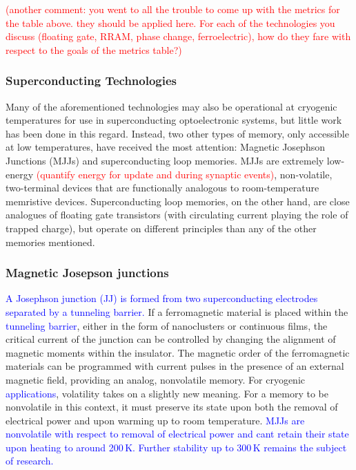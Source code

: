\documentclass[twocolumn]{article}
\begin{document}
\textcolor{red}{(another comment: you went to all the trouble to come up with the metrics for the table above. they should be applied here. For each of the technologies you discuss (floating gate, RRAM, phase change, ferroelectric), how do they fare with respect to the goals of the metrics table?)}

\subsubsection{Superconducting Technologies}
Many of the aforementioned technologies may also be operational at cryogenic temperatures for use in superconducting optoelectronic systems, but little work has been done in this regard. Instead, two other types of memory, only accessible at low temperatures, have received the most attention: Magnetic Josephson Junctions (MJJs) and superconducting loop memories. MJJs are extremely low-energy \textcolor{red}{(quantify energy for update and during synaptic events)}, non-volatile, two-terminal devices that are functionally analogous to room-temperature memristive devices. Superconducting loop memories, on the other hand, are close analogues of floating gate transistors (with circulating current playing the role of trapped charge), but operate on different principles than any of the other memories mentioned.

\subsubsection{Magnetic Josepson junctions}
\textcolor{blue}{A Josephson junction (JJ) is formed from two superconducting electrodes separated by a tunneling barrier.} If a ferromagnetic material is placed within the \textcolor{blue}{tunneling barrier}, either in the form of nanoclusters or continuous films, the critical current of the junction can be controlled by changing the alignment of magnetic moments within the insulator. The magnetic order of the ferromagnetic materials can be programmed with current pulses in the presence of an external magnetic field, providing an analog, nonvolatile memory. For cryogenic \textcolor{blue}{applications}, volatility takes on a slightly new meaning. For a memory to be nonvolatile in this context, it must preserve its state upon both the removal of electrical power and upon warming up to room temperature. \textcolor{blue}{MJJs are nonvolatile with respect to removal of electrical power and cant retain their state upon heating to around 200\,K. Further stability up to 300\,K remains the subject of research.} 
\end{document}
